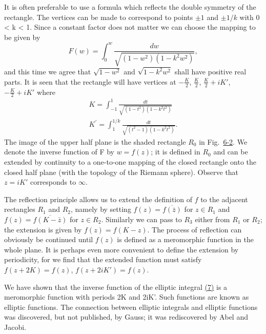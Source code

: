It is often preferable to use a formula which reflects the double symmetry of the rectangle. The vertices can be made to correspond to points $\pm1$ and $\pm1/k$ with 0 < k < 1. Since a constant factor does not matter we can choose the mapping to be given by
\begin{equation*}
F (w) = \int_ {0} ^ {w} \frac {d w}{\sqrt {(1 - w ^ {2}) (1 - k ^ {2} w ^ {2})}},\tag{7}\label{eq:6.7}
\end{equation*}
and this time we agree that $\sqrt{1-w^{2}}$ and $\sqrt{1-k^{2}w^{2}}$ shall have positive real parts. It is seen that the rectangle will have vertices at $-\frac{K}{2}$, $\frac{K}{2}$, $\frac{K}{2} + iK'$, $-\frac{K}{2} + iK'$ where
\begin{equation*}
\begin{array}{l} K = \int_ {- 1} ^ {1} \frac {d t}{\sqrt {(1 - t ^ {2}) (1 - k ^ {2} t ^ {2})}} \\ K ^ {\prime} = \int_ {1} ^ {1 / k} \frac {d t}{\sqrt {(t ^ {2} - 1) (1 - k ^ {2} t ^ {2})}}. \end{array}
\end{equation*}
The image of the upper half plane is the shaded rectangle $R_{0}$ in Fig.~\hyperref[fig:6-2]{6-2}. We denote the inverse function of F by $w = f(z)$; it is defined in $R_{0}$ and can be extended by continuity to a one-to-one mapping of the closed rectangle onto the closed half plane (with the topology of the Riemann sphere). Observe that $z = iK'$ corresponds to $\infty$.

The reflection principle allows us to extend the definition of $f$ to the adjacent rectangles $R_{1}$ and $R_{2}$, namely by setting $f(z) = \overline{f(\bar{z})}$ for $z \in R_{1}$ and $f(z) = \overline{f(K - \bar{z})}$ for $z \in R_{2}$. Similarly we can pass to $R_{3}$ either from $R_{1}$ or $R_{2}$; the extension is given by $f(z) = f(K - z)$. The process of reflection can obviously be continued until $f(z)$ is defined as a meromorphic function in the whole plane. It is perhaps even more convenient to define the extension by periodicity, for we find that the extended function must satisfy $f(z + 2K) = f(z)$, $f(z + 2iK') = f(z)$.

We have shown that the inverse function of the elliptic integral \hyperref[eq:6.7]{(7)} is a meromorphic function with periods 2K and 2iK'. Such functions are known as elliptic functions. The connection between elliptic integrals
and elliptic functions was discovered, but not published, by Gauss; it was rediscovered by Abel and Jacobi.

